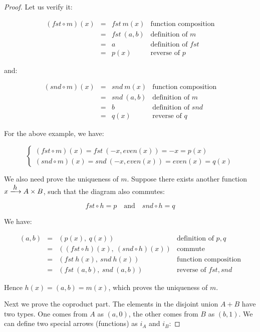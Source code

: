 \documentclass[UTF8]{article}
\begin{document}
\begin{proof}
Let us verify it:

\[
\begin{array}{rcll}
(fst \circ m)(x) & = & fst\ m(x) & \text{function composition} \\
                 & = & fst\ (a, b) & \text{definition of $m$} \\
                 & = & a & \text{definition of $fst$} \\
                 & = & p(x) & \text{reverse of $p$}
\end{array}
\]

and:

\[
\begin{array}{rcll}
(snd \circ m)(x) & = & snd\ m(x) & \text{function composition} \\
                 & = & snd\ (a, b) & \text{definition of $m$} \\
                 & = & b & \text{definition of $snd$} \\
                 & = & q(x) & \text{reverse of $q$}
\end{array}
\]

For the above example, we have:

\[
\begin{cases}
(fst \circ m)(x) = fst\ (-x, even(x)) = -x = p(x) \\
(snd \circ m)(x) = snd\ (-x, even(x)) = even(x) = q(x)
\end{cases}
\]

We also need prove the uniqueness of $m$. Suppose there exists another function $x \arrowto{h} A \times B$, such that the diagram also commutes:

\[
fst \circ h = p \quad \text{and} \quad snd \circ h = q
\]

We have:

\[
\begin{array}{rcll}
(a, b) & = & (p(x),\ q(x)) & \text{definition of $p, q$} \\
       & = & ((fst \circ h)(x),\ (snd \circ h)(x)) & \text{commute} \\
       & = & (fst\ h(x),\ snd\ h(x)) & \text{function composition} \\
       & = & (fst\ (a, b),\ snd\ (a, b)) & \text{reverse of $fst, snd$}
\end{array}
\]

Hence $h(x) = (a, b) = m(x)$, which proves the uniqueness of $m$.

Next we prove the coproduct part. The elements in the disjoint union $A + B$ have two types. One comes from $A$ as $(a, 0)$, the other comes from $B$ as $(b, 1)$. We can define two special arrows (functions) as $i_A$ and $i_B$:


\end{proof}
\end{document}
